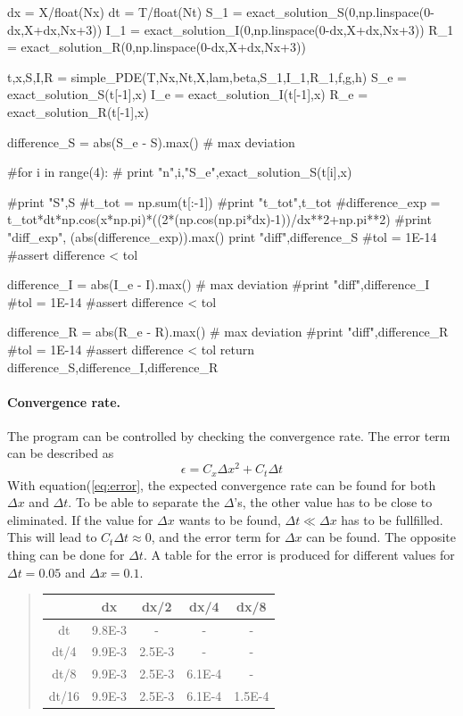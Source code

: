 \documentclass[%
twoside,                 %
final,                   %
10pt]{article}
\begin{document}
    dx = X/float(Nx)
    dt = T/float(Nt)
    S_1 = exact_solution_S(0,np.linspace(0-dx,X+dx,Nx+3))
    I_1 = exact_solution_I(0,np.linspace(0-dx,X+dx,Nx+3))
    R_1 = exact_solution_R(0,np.linspace(0-dx,X+dx,Nx+3))
     
    t,x,S,I,R = simple_PDE(T,Nx,Nt,X,lam,beta,S_1,I_1,R_1,f,g,h)
    S_e = exact_solution_S(t[-1],x)
    I_e = exact_solution_I(t[-1],x)
    R_e = exact_solution_R(t[-1],x)
    
    difference_S = abs(S_e - S).max()  # max deviation

    
    #for i in range(4):
    #    print "n",i,"S_e",exact_solution_S(t[i],x)
    
    #print "S",S
    #t_tot = np.sum(t[:-1])
    #print "t_tot",t_tot
    #difference_exp = t_tot*dt*np.cos(x*np.pi)*((2*(np.cos(np.pi*dx)-1))/dx**2+np.pi**2)
    #print "diff_exp", (abs(difference_exp)).max()
    print "diff",difference_S
    #tol = 1E-14
    #assert difference < tol
    
    difference_I = abs(I_e - I).max()  # max deviation
    #print "diff",difference_I
    #tol = 1E-14
    #assert difference < tol
   
    difference_R = abs(R_e - R).max()  # max deviation
    #print "diff",difference_R
    #tol = 1E-14
    #assert difference < tol
    return difference_S,difference_I,difference_R
\epycod

\paragraph{Convergence rate.}
The program can be controlled by checking the convergence rate. The error term can be described as  
\begin{equation} \label{eq:error}
    \epsilon = C_x\Delta x^2 + C_t \Delta t
\end{equation}
With equation(\ref{eq:error}, the expected convergence rate can be found for both $\Delta x$ and $\Delta t$. To be able to separate the $\Delta$'s, the other value has to be close to eliminated. If the value for $\Delta x$ wants to be found,  $\Delta t \ll \Delta x$ has to be fullfilled. This will lead to $C_t\Delta t \approx 0$, and the error term for $\Delta x$ can be found. The opposite thing can  be done for $\Delta t$. A table for the error is produced for different values for $\Delta t = 0.05$ and $\Delta x=0.1$.


\begin{quote}
\begin{tabular}{ccccc}
\hline
\multicolumn{1}{c}{  } & \multicolumn{1}{c}{ dx } & \multicolumn{1}{c}{ dx/2 } & \multicolumn{1}{c}{ dx/4 } & \multicolumn{1}{c}{ dx/8 } \\
\hline
dt     & 9.8E-3 & -      & -      & -      \\
dt/4   & 9.9E-3 & 2.5E-3 & -      & -      \\
dt/8   & 9.9E-3 & 2.5E-3 & 6.1E-4 & -      \\
dt/16  & 9.9E-3 & 2.5E-3 & 6.1E-4 & 1.5E-4 \\
\hline
\end{tabular}
\end{quote}
\end{document}
